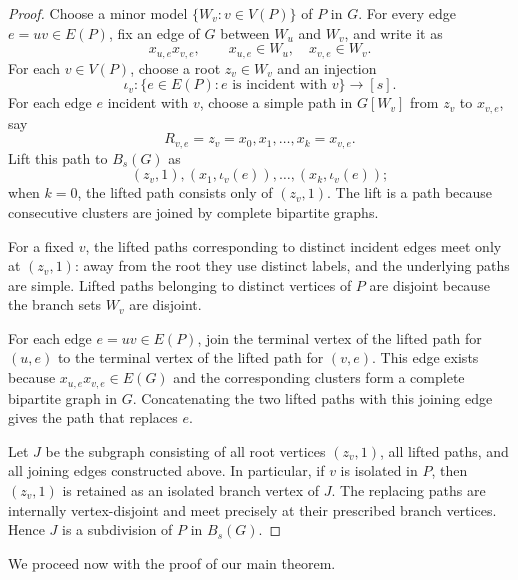 \documentclass[11pt]{article}
\theoremstyle{definition}
\begin{document}
\begin{proof}
Choose a minor model $\{W_v:v\in V(P)\}$ of $P$ in $G$. For every edge
$e=uv\in E(P)$, fix an edge of $G$ between $W_u$ and $W_v$, and write it
as
\[
x_{u,e}x_{v,e},
\qquad
x_{u,e}\in W_u,
\quad
x_{v,e}\in W_v.
\]
For each $v\in V(P)$, choose a root $z_v\in W_v$ and an injection
\[
\iota_v:
\{e\in E(P):e\text{ is incident with }v\}
\longrightarrow [s].
\]
For each edge $e$ incident with $v$, choose a simple path in $G[W_v]$ from
$z_v$ to $x_{v,e}$, say
\[
R_{v,e}=z_v=x_0,x_1,\ldots,x_k=x_{v,e}.
\]
Lift this path to $B_s(G)$ as
\[
(z_v,1),(x_1,\iota_v(e)),\ldots,(x_k,\iota_v(e));
\]
when $k=0$, the lifted path consists only of $(z_v,1)$. The lift is a
path because consecutive clusters are joined by complete bipartite graphs.

For a fixed $v$, the lifted paths corresponding to distinct incident edges
meet only at $(z_v,1)$: away from the root they use distinct labels, and
the underlying paths are simple. Lifted paths belonging to distinct
vertices of $P$ are disjoint because the branch sets $W_v$ are disjoint.

For each edge $e=uv\in E(P)$, join the terminal vertex of the lifted path
for $(u,e)$ to the terminal vertex of the lifted path for $(v,e)$. This
edge exists because $x_{u,e}x_{v,e}\in E(G)$ and the corresponding
clusters form a complete bipartite graph in $G$. Concatenating the two lifted paths with
this joining edge gives the path that replaces $e$.

Let $J$ be the subgraph consisting of all root vertices $(z_v,1)$, all
lifted paths, and all joining edges constructed above. In particular, if
$v$ is isolated in $P$, then $(z_v,1)$ is retained as an isolated branch
vertex of $J$. The replacing paths are internally vertex-disjoint and meet
precisely at their prescribed branch vertices. Hence $J$ is a subdivision
of $P$ in $B_s(G)$.
\end{proof}

We proceed now with the proof of our main theorem. 
\end{document}
